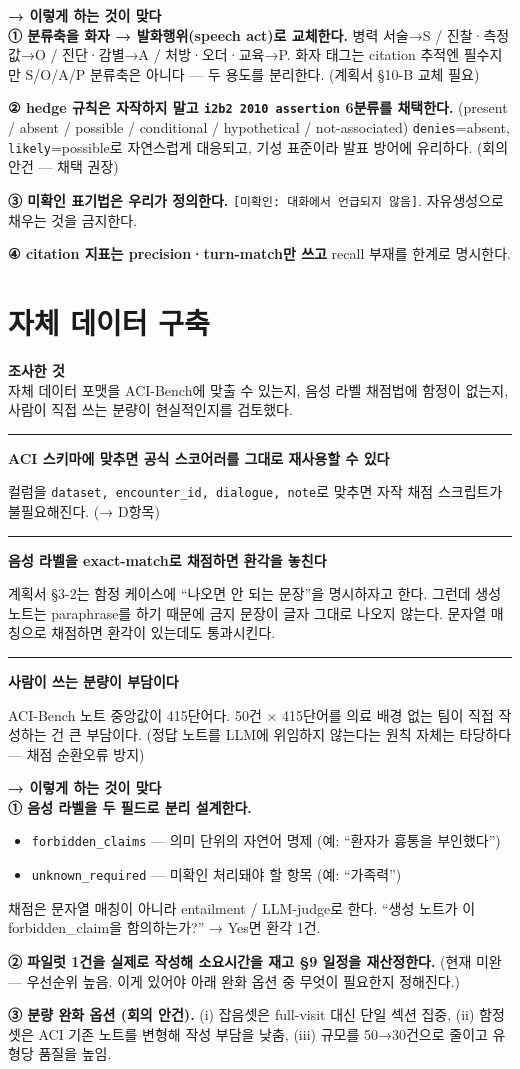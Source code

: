 \documentclass[10.5pt,a4paper]{article}
\renewcommand{\emph}[1]{{\color{muted}#1}}
\newcommand{\investigated}[1]{%
\begin{tcolorbox}[enhanced, blank, breakable,
  borderline west={2.2pt}{0pt}{rulegray},
  left=10pt, right=0pt, top=2pt, bottom=2pt, before skip=6pt, after skip=10pt]
{\footnotesize\bfseries\color{navy}조사한 것}\\[2pt]#1
\end{tcolorbox}}
\newcommand{\finding}[1]{%
\par\vspace{0.9em}\noindent
\textcolor{navy}{\rule[-0.05em]{2.4pt}{0.82em}}\hspace{0.55em}\textbf{#1}\par\nobreak\vspace{0.15em}}
\newcommand{\proposal}[1]{%
\begin{tcolorbox}[enhanced, breakable, colback=softgray, boxrule=0pt, frame hidden,
  borderline west={3pt}{0pt}{navy}, arc=0pt,
  left=12pt, right=10pt, top=8pt, bottom=8pt, before skip=12pt, after skip=8pt,
  before upper={\setlength{\parskip}{0.7em}\setlength{\parindent}{0pt}}]
{\bfseries\color{navy}→ 이렇게 하는 것이 맞다}\\[3pt]#1
\end{tcolorbox}}
\newcommand{\hl}[1]{\textbf{\color{accent}#1}}
\newcommand{\subhead}[1]{\par\vspace{1.0em}{\bfseries\color{navy}#1}\par\vspace{-0.15em}}
\begin{document}
\proposal{
\textbf{① 분류축을 화자 → 발화행위(speech act)로 교체한다.}
병력 서술→S / 진찰·측정값→O / 진단·감별→A / 처방·오더·교육→P.
화자 태그는 citation 추적엔 필수지만 S/O/A/P 분류축은 아니다 — 두 용도를 분리한다. \emph{(계획서 §10-B 교체 필요)}

\textbf{② hedge 규칙은 자작하지 말고 \texttt{i2b2 2010 assertion} 6분류를 채택한다.}
(present / absent / possible / conditional / hypothetical / not-associated)
\texttt{denies}=absent, \texttt{likely}=possible로 자연스럽게 대응되고, 기성 표준이라 발표 방어에 유리하다. \emph{(회의 안건 — 채택 권장)}

\textbf{③ 미확인 표기법은 우리가 정의한다.}
\texttt{[미확인: 대화에서 언급되지 않음]}. 자유생성으로 채우는 것을 금지한다.

\textbf{④ citation 지표는 precision·turn-match만 쓰고} recall 부재를 한계로 명시한다.
}

\section{자체 데이터 구축}

\investigated{자체 데이터 포맷을 ACI-Bench에 맞출 수 있는지, 음성 라벨 채점법에 함정이 없는지, 사람이 직접 쓰는 분량이 현실적인지를 검토했다.}

\subhead{확인된 사실}

\finding{ACI 스키마에 맞추면 공식 스코어러를 그대로 재사용할 수 있다}

컬럼을 \texttt{dataset, encounter\_id, dialogue, note}로 맞추면 자작 채점 스크립트가 불필요해진다. (→ D항목)

\finding{\hl{음성 라벨을 exact-match로 채점하면 환각을 놓친다}}

계획서 §3-2는 함정 케이스에 ``나오면 안 되는 문장''을 명시하자고 한다. 그런데 생성 노트는 paraphrase를 하기 때문에 금지 문장이 글자 그대로 나오지 않는다. 문자열 매칭으로 채점하면 환각이 있는데도 통과시킨다.

\finding{사람이 쓰는 분량이 부담이다}

ACI-Bench 노트 중앙값이 415단어다. 50건 × 415단어를 의료 배경 없는 팀이 직접 작성하는 건 큰 부담이다. (정답 노트를 LLM에 위임하지 않는다는 원칙 자체는 타당하다 — 채점 순환오류 방지)

\proposal{
\textbf{① 음성 라벨을 두 필드로 분리 설계한다.}
\begin{itemize}
\item \texttt{forbidden\_claims} — 의미 단위의 자연어 명제 (예: ``환자가 흉통을 부인했다'')
\item \texttt{unknown\_required} — 미확인 처리돼야 할 항목 (예: ``가족력'')
\end{itemize}
채점은 문자열 매칭이 아니라 entailment / LLM-judge로 한다. ``생성 노트가 이 forbidden\_claim을 함의하는가?'' → Yes면 환각 1건.

\textbf{② 파일럿 1건을 실제로 작성해 소요시간을 재고 §9 일정을 재산정한다.}
\emph{(현재 미완 — 우선순위 높음. 이게 있어야 아래 완화 옵션 중 무엇이 필요한지 정해진다.)}

\textbf{③ 분량 완화 옵션 (회의 안건).}
(i) 잡음셋은 full-visit 대신 단일 섹션 집중, (ii) 함정셋은 ACI 기존 노트를 변형해 작성 부담을 낮춤, (iii) 규모를 50→30건으로 줄이고 유형당 품질을 높임.
}
\end{document}
